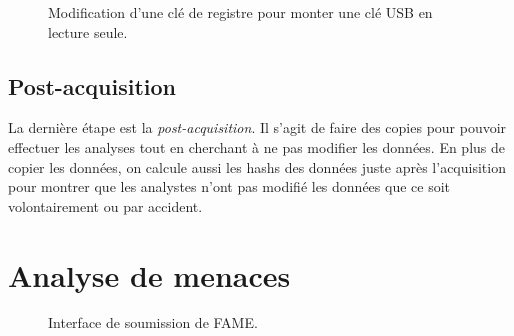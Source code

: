 \begin{figure}
    \centering
    \caption{Modification d'une clé de registre pour monter une clé USB en lecture seule.}
    \label{fig:usb-key-read-only}
\end{figure}





\subsection{Post-acquisition}

La dernière étape est la \textit{post-acquisition}. Il s'agit de faire des copies pour pouvoir effectuer les analyses tout en cherchant à ne pas modifier les données. En plus de copier les données, on calcule aussi les hashs des données juste après l'acquisition pour montrer que les analystes n'ont pas modifié les données que ce soit volontairement ou par accident.










\section{Analyse de menaces}

\begin{figure}
    \centering
    \caption{Interface de soumission de FAME.}
    \label{fig:fame-submission}
\end{figure}

